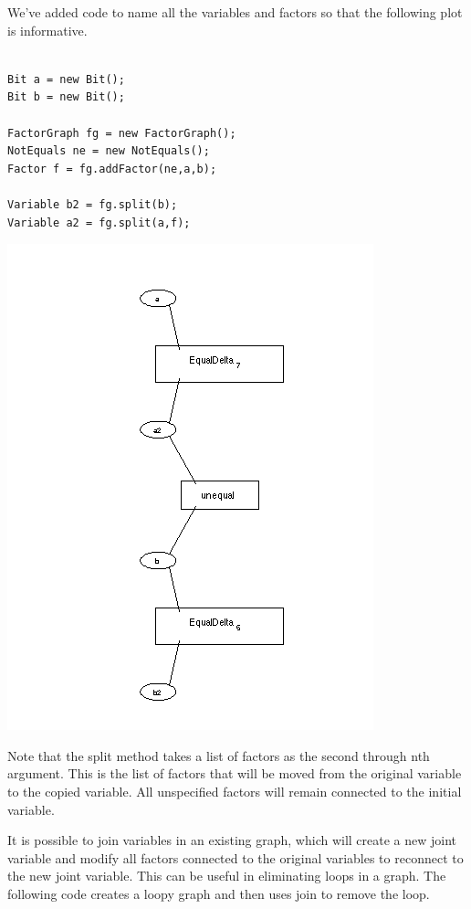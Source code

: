 We've added code to name all the variables and factors so that the following plot is informative.

\fi

\ifjava
\begin{lstlisting}

Bit a = new Bit();
Bit b = new Bit();
 
FactorGraph fg = new FactorGraph();
NotEquals ne = new NotEquals();
Factor f = fg.addFactor(ne,a,b);
		   
Variable b2 = fg.split(b);
Variable a2 = fg.split(a,f);
\end{lstlisting}

\fi

\includegraphics[width=.75\textwidth]{images/SplitGraph.png}
 
Note that the split method takes a list of factors as the second through nth argument. This is the list of factors that will be moved from the original variable to the copied variable. All unspecified factors will remain connected to the initial variable.



It is possible to join variables in an existing graph, which will create a new joint variable and modify all factors connected to the original variables to reconnect to the new joint variable. This can be useful in eliminating loops in a graph. The following code creates a loopy graph and then uses join to remove the loop.

